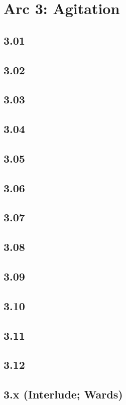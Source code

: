 \part*{Arc 3: Agitation}
 \chapter*{3.01}
 \chapter*{3.02}
 \chapter*{3.03}
 \chapter*{3.04}
 \chapter*{3.05}
 \chapter*{3.06}
 \chapter*{3.07}
 \chapter*{3.08}
 \chapter*{3.09}
 \chapter*{3.10}
 \chapter*{3.11}
 \chapter*{3.12}
 \chapter*{3.x (Interlude; Wards)}














